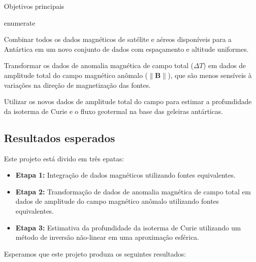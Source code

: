 \documentclass[12pt,a4paper,oneside]{book}
\begin{document}
\begin{summarybox}{\faBullseye{} Objetivos principais}
  \begin{listnomargin}{enumerate}
    \item Combinar todos os dados magnéticos de satélite e aéreos disponíveis
      para a Antártica em um novo conjunto de dados com espaçamento e altitude
      uniformes.
    \item Transformar os dados de anomalia magnética de campo total ($\Delta
      T$) em dados de amplitude total do campo magnético anômalo
      ($\|\mathbf{B}\|$), que são menos sensíveis à variações na direção de
      magnetização das fontes.
    \item Utilizar os novos dados de amplitude total do campo para estimar a
      profundidade da isoterma de Curie e o fluxo geotermal na base das
      geleiras antárticas.
  \end{listnomargin}
\end{summarybox}

\subsection{Resultados esperados}

Este projeto está divido em três epatas:

\begin{itemize}
  \item \textbf{Etapa 1:} Integração de dados magnéticos utilizando fontes
    equivalentes.
  \item \textbf{Etapa 2:} Transformação de dados de anomalia magnética de campo
    total em dados de amplitude do campo magnético anômalo utilizando fontes
    equivalentes.
  \item \textbf{Etapa 3:} Estimativa da profundidade da isoterma de Curie
    utilizando um método de inversão não-linear em uma aproximação esférica.
\end{itemize}

\noindent
Esperamos que este projeto produza os seguintes resultados:
\end{document}
